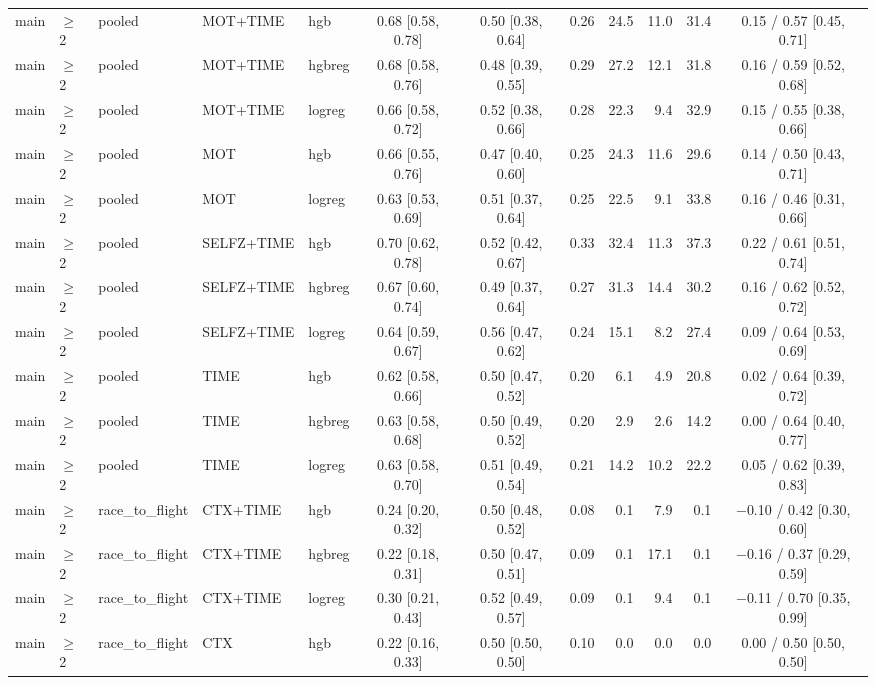 \begin{longtable}{@{}lllllcccrrrc@{}}
main & $\geq$2 & pooled & MOT+TIME & hgb & 0.68 [0.58, 0.78] & 0.50 [0.38, 0.64] & 0.26 & 24.5 & 11.0 & 31.4 & 0.15 / 0.57 [0.45, 0.71] \\
main & $\geq$2 & pooled & MOT+TIME & hgbreg & 0.68 [0.58, 0.76] & 0.48 [0.39, 0.55] & 0.29 & 27.2 & 12.1 & 31.8 & 0.16 / 0.59 [0.52, 0.68] \\
main & $\geq$2 & pooled & MOT+TIME & logreg & 0.66 [0.58, 0.72] & 0.52 [0.38, 0.66] & 0.28 & 22.3 & 9.4 & 32.9 & 0.15 / 0.55 [0.38, 0.66] \\
main & $\geq$2 & pooled & MOT & hgb & 0.66 [0.55, 0.76] & 0.47 [0.40, 0.60] & 0.25 & 24.3 & 11.6 & 29.6 & 0.14 / 0.50 [0.43, 0.71] \\
main & $\geq$2 & pooled & MOT & logreg & 0.63 [0.53, 0.69] & 0.51 [0.37, 0.64] & 0.25 & 22.5 & 9.1 & 33.8 & 0.16 / 0.46 [0.31, 0.66] \\
main & $\geq$2 & pooled & SELFZ+TIME & hgb & 0.70 [0.62, 0.78] & 0.52 [0.42, 0.67] & 0.33 & 32.4 & 11.3 & 37.3 & 0.22 / 0.61 [0.51, 0.74] \\
main & $\geq$2 & pooled & SELFZ+TIME & hgbreg & 0.67 [0.60, 0.74] & 0.49 [0.37, 0.64] & 0.27 & 31.3 & 14.4 & 30.2 & 0.16 / 0.62 [0.52, 0.72] \\
main & $\geq$2 & pooled & SELFZ+TIME & logreg & 0.64 [0.59, 0.67] & 0.56 [0.47, 0.62] & 0.24 & 15.1 & 8.2 & 27.4 & 0.09 / 0.64 [0.53, 0.69] \\
main & $\geq$2 & pooled & TIME & hgb & 0.62 [0.58, 0.66] & 0.50 [0.47, 0.52] & 0.20 & 6.1 & 4.9 & 20.8 & 0.02 / 0.64 [0.39, 0.72] \\
main & $\geq$2 & pooled & TIME & hgbreg & 0.63 [0.58, 0.68] & 0.50 [0.49, 0.52] & 0.20 & 2.9 & 2.6 & 14.2 & 0.00 / 0.64 [0.40, 0.77] \\
main & $\geq$2 & pooled & TIME & logreg & 0.63 [0.58, 0.70] & 0.51 [0.49, 0.54] & 0.21 & 14.2 & 10.2 & 22.2 & 0.05 / 0.62 [0.39, 0.83] \\
main & $\geq$2 & race\_to\_flight & CTX+TIME & hgb & 0.24 [0.20, 0.32] & 0.50 [0.48, 0.52] & 0.08 & 0.1 & 7.9 & 0.1 & $-$0.10 / 0.42 [0.30, 0.60] \\
main & $\geq$2 & race\_to\_flight & CTX+TIME & hgbreg & 0.22 [0.18, 0.31] & 0.50 [0.47, 0.51] & 0.09 & 0.1 & 17.1 & 0.1 & $-$0.16 / 0.37 [0.29, 0.59] \\
main & $\geq$2 & race\_to\_flight & CTX+TIME & logreg & 0.30 [0.21, 0.43] & 0.52 [0.49, 0.57] & 0.09 & 0.1 & 9.4 & 0.1 & $-$0.11 / 0.70 [0.35, 0.99] \\
main & $\geq$2 & race\_to\_flight & CTX & hgb & 0.22 [0.16, 0.33] & 0.50 [0.50, 0.50] & 0.10 & 0.0 & 0.0 & 0.0 & 0.00 / 0.50 [0.50, 0.50] \\

\end{longtable}
